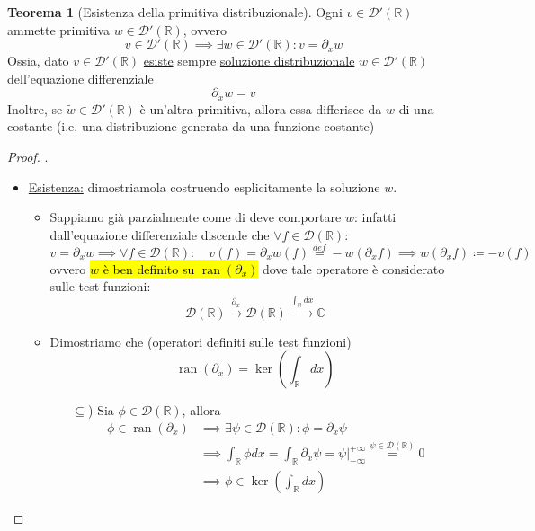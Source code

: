 \documentclass[a4paper,10pt]{article}
\theoremstyle{definition}
\DeclareMathOperator*{\ran}{ran}
\newcommand{\re}{\mathbb{R}} %
\newcommand{\im}{\mathbb{C}} %
\theoremstyle{indentdefinition}
\theoremstyle{indenttheorem}
\newtheorem{thm}{Teorema}
\theoremstyle{myremark}
\theoremstyle{indentgeneral}
\newenvironment{myboxed} 
{\noindent\begin{lrbox}{\mybox}\begin{minipage}{\textwidth}}
{\end{minipage}\end{lrbox}\fbox{\usebox{\mybox}}}
\begin{document}
\begin{myboxed}
    \begin{thm}[Esistenza della primitiva distribuzionale]
        Ogni $v\in \mathcal{D}'(\re)$ ammette primitiva $w\in\mathcal{D}'(\re)$, ovvero
        $$v\in\mathcal{D}'(\re)\implies\exists w\in\mathcal{D}'(\re): v=\partial_xw$$
        Ossia, dato $v\in\mathcal{D}'(\re)$ \underline{esiste} sempre \underline{soluzione distribuzionale} $w\in\mathcal{D}'(\re)$ dell'equazione differenziale
        $$\partial_x w=v$$
        Inoltre, se $\widetilde{w}\in\mathcal{D}'(\re)$ è un'altra primitiva, allora essa differisce da $w$ di una costante (i.e. una distribuzione generata da una funzione costante)
    \end{thm}
\end{myboxed}

\begin{proof}
    .
    \begin{itemize}
        \item \underline{Esistenza:} dimostriamola costruendo esplicitamente la soluzione $w$. 
        \begin{itemize}
            \item  Sappiamo già parzialmente come di deve comportare $w$: infatti dall'equazione differenziale discende che $\forall f\in \mathcal{D}(\re)$:
        $$ v=\partial_xw\implies \forall f\in \mathcal{D}(\re):\quad v(f)=\partial_xw(f)\overset{def}{=}-w(\partial_x f)\implies \boxed{w(\partial_xf)\coloneqq-v(f)}$$
        ovvero \hl{$w$ è ben definito su $\ran(\partial_x)$} dove tale operatore è considerato sulle test funzioni:
        $$\mathcal{D}(\re)\overset{\partial_x}{\longrightarrow}\mathcal{D}(\re)\overset{\int_\re dx}{\longrightarrow}\im$$
        \item Dimostriamo che (operatori definiti sulle test funzioni)
        $$\boxed{\ran(\partial_x)=\ker(\int_\re dx)}$$
        \begin{itemize}
            \item[\underline{$\subseteq$})] Sia $\phi\in \mathcal{D}(\re)$, allora
            \begin{align*}
                \phi\in\ran(\partial_x)&\implies\exists\psi\in \mathcal{D}(\re): \phi=\partial_x\psi\\
                &\implies \int_\re\phi dx=\int_\re\partial_x\psi=\psi\bigg|_{-\infty}^{+\infty}\overset{\psi\in \mathcal{D}(\re)}{=}0\\
                &\implies \phi\in\ker(\int_\re dx)
            \end{align*}

\end{itemize}
\end{itemize}
\end{itemize}
\end{proof}
\end{document}
